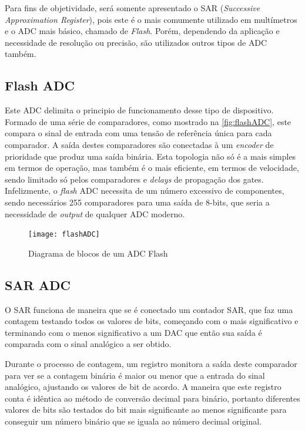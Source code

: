 Para fins de objetividade, será somente apresentado o \gls{SAR} (\textit{Successive Approximation Register}), pois este é o mais comumente utilizado em multímetros e o \gls{ADC} mais básico, chamado de \textit{Flash}. Porém, dependendo da aplicação e necessidade de resolução ou precisão, são utilizados outros tipos de \gls{ADC} também.

\subsection{Flash ADC}\label{flashADC}

Este \gls{ADC} delimita o principio de funcionamento desse tipo de dispositivo. Formado de uma série de comparadores, como mostrado na \autoref{fig:flashADC}, este compara o sinal de entrada com uma tensão de referência única para cada comparador. A saída destes comparadores são conectadas à um \textit{encoder} de prioridade que produz uma saída binária.
Esta topologia não só é a mais simples em termos de operação, mas também é o mais eficiente, em termos de velocidade, sendo limitado só pelos comparadores e \textit{delays} de propagação dos gates. Infelizmente, o \textit{flash} \gls{ADC} necessita de um número excessivo de componentes, sendo necessários 255 comparadores para uma saída de 8-bits, que seria a necessidade de \textit{output} de qualquer \gls{ADC} moderno.

\begin{figure}[htb!]%
    \caption{Diagrama de blocos de um ADC Flash}%
    \label{fig:flashADC}%
    \texttt{[image: flashADC]}%
\end{figure}

\subsection{SAR ADC}\label{SARADC}
O \gls{SAR} funciona de maneira que se é conectado um contador \gls{SAR}, que faz uma contagem testando todos os valores de bits, começando com o mais significativo e terminando com o menos significativo a um \gls{DAC} que então sua saída é comparada com o sinal analógico a ser obtido.

Durante o processo de contagem, um registro monitora a saída deste comparador para ver se a contagem binária é maior ou menor que a entrada do sinal analógico, ajustando os valores de bit de acordo. A maneira que este registro conta é idêntica ao método de conversão decimal para binário, portanto diferentes valores de bits são testados do bit mais significante ao menos significante para conseguir um número binário que se iguala ao número decimal original.

